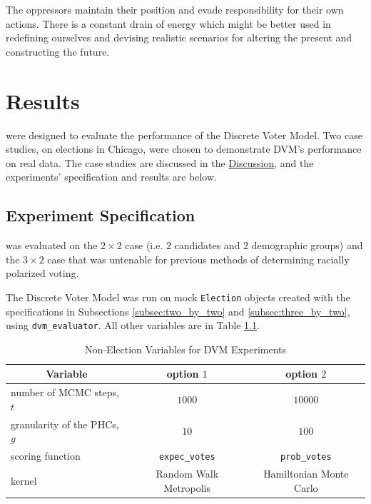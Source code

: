 \begin{savequote}[75mm]
The oppressors maintain their position and evade responsibility for their own actions. There is a constant drain of energy which might be better used in redefining ourselves and devising realistic scenarios for altering the present and constructing the future.
\end{savequote}

\chapter{Results}
\label{chap:results}

 were designed to evaluate the performance of the Discrete Voter Model. Two case studies, on elections in Chicago, were chosen to demonstrate DVM's performance on real data. The case studies are discussed in the \hyperref[chap:discussion]{Discussion}, and the experiments' specification and results are below.

\section{Experiment Specification}
\label{sec:exper_spec}

 was evaluated on the $2 \times 2$ case (i.e. $2$ candidates and $2$ demographic groups) and the $3 \times 2$ case that was untenable for previous methods of determining racially polarized voting.

The Discrete Voter Model was run on mock \texttt{Election} objects created with the specifications in Subsections \ref{subsec:two_by_two} and \ref{subsec:three_by_two}, using \texttt{dvm\_evaluator}. All other variables are in Table \ref{table:dvm_vars}.

\begin{table}[ht]
 \centering
 \caption{Non-Election Variables for DVM Experiments}
 \label{table:dvm_vars}
 \begin{tabular}{|l|c|c|}
   \hline
   \multicolumn{1}{|c}{Variable} & \multicolumn{1}{|c|}{option $1$}& \multicolumn{1}{c|}{option $2$} \\
   \hline
   number of MCMC steps, $t$ & $1000$ & $10000$ \\
   granularity of the PHCs, $g$ & $10$ & $100$ \\
   scoring function & \texttt{expec\_votes} & \texttt{prob\_votes} \\
   kernel & Random Walk Metropolis & Hamiltonian Monte Carlo \\
  \hline
 \end{tabular}
\end{table}

